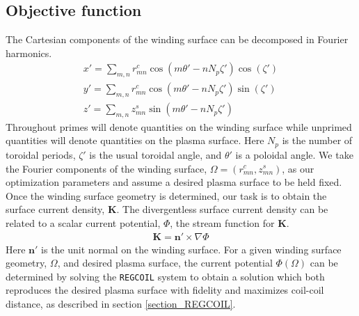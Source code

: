 \documentclass[aps,unsortedaddress]{revtex4-1}
\begin{document}
\subsection{Objective function}
The Cartesian components of the winding surface can be decomposed in Fourier harmonics.
\begin{gather}
x' = \sum_{m,n} r_{mn}^c \cos(m \theta' - n N_p \zeta') \cos (\zeta') \\
y' = \sum_{m,n} r_{mn}^c \cos(m \theta' - n N_p \zeta') \sin (\zeta') \\
z' = \sum_{m,n} z_{mn}^s \sin(m \theta' - n N_p \zeta') 
\label{Fourier}
\end{gather}
Throughout primes will denote quantities on the winding surface while unprimed quantities will denote quantities on the plasma surface. Here $N_p$ is the number of toroidal periods, $\zeta'$ is the usual toroidal angle, and $\theta'$ is a poloidal angle. We take the Fourier components of the winding surface, $\Omega = (r_{mn}^c, z_{mn}^s)$, as our optimization parameters and assume a desired plasma surface to be held fixed. Once the winding surface geometry is determined, our task is to obtain the surface current density, $\bm{K}$. The divergentless surface current density can be related to a scalar current potential, $\Phi$, the stream function for $\bm{K}$.
\begin{gather}
\bm{K} = \bm{n}' \times \nabla \Phi
\end{gather}
Here $\bm{n}'$ is the unit normal on the winding surface. For a given winding surface geometry, $\Omega$, and desired plasma surface, the current potential $\Phi (\Omega)$ can be determined by solving the \texttt{REGCOIL} system to obtain a solution which both reproduces the desired plasma surface with fidelity and maximizes coil-coil distance, as described in section \ref{section_REGCOIL}.
\end{document}
